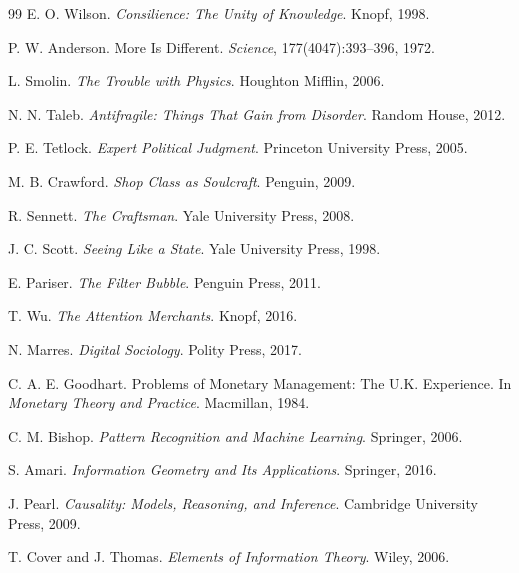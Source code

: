 \documentclass[11pt]{article}
\begin{document}
\begin{thebibliography}{99}
E. O. Wilson.
\newblock \emph{Consilience: The Unity of Knowledge}.
\newblock Knopf, 1998.

P. W. Anderson.
\newblock More Is Different.
\newblock \emph{Science}, 177(4047):393--396, 1972.

L. Smolin.
\newblock \emph{The Trouble with Physics}.
\newblock Houghton Mifflin, 2006.

N. N. Taleb.
\newblock \emph{Antifragile: Things That Gain from Disorder}.
\newblock Random House, 2012.

P. E. Tetlock.
\newblock \emph{Expert Political Judgment}.
\newblock Princeton University Press, 2005.

M. B. Crawford.
\newblock \emph{Shop Class as Soulcraft}.
\newblock Penguin, 2009.

R. Sennett.
\newblock \emph{The Craftsman}.
\newblock Yale University Press, 2008.

J. C. Scott.
\newblock \emph{Seeing Like a State}.
\newblock Yale University Press, 1998.

E. Pariser.
\newblock \emph{The Filter Bubble}.
\newblock Penguin Press, 2011.

T. Wu.
\newblock \emph{The Attention Merchants}.
\newblock Knopf, 2016.

N. Marres.
\newblock \emph{Digital Sociology}.
\newblock Polity Press, 2017.

C. A. E. Goodhart.
\newblock Problems of Monetary Management: The U.K. Experience.
\newblock In \emph{Monetary Theory and Practice}. Macmillan, 1984.

C. M. Bishop.
\newblock \emph{Pattern Recognition and Machine Learning}.
\newblock Springer, 2006.

S. Amari.
\newblock \emph{Information Geometry and Its Applications}.
\newblock Springer, 2016.

J. Pearl.
\newblock \emph{Causality: Models, Reasoning, and Inference}.
\newblock Cambridge University Press, 2009.

T. Cover and J. Thomas.
\newblock \emph{Elements of Information Theory}.
\newblock Wiley, 2006.

\end{thebibliography}
\end{document}
